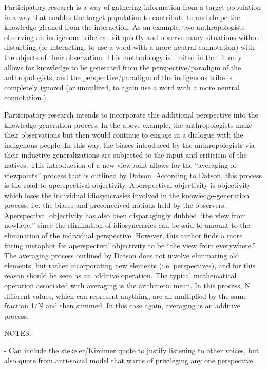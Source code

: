 \documentclass{lps}
\begin{document}
Participatory research is a way of gathering information from a target
population in a way that enables the target population to contribute to and
shape the knowledge gleaned from the interaction. As an example, two
anthropologists observing an indigenous tribe can sit quietly and observe many
situations without disturbing (or interacting, to use a word with a more
neutral connotation) with the objects of their observation. This methodology
is limited in that it only allows for knowledge to be generated from the
perspective/paradigm of the anthropologists, and the perspective/paradigm of
the indigenous tribe is completely ignored (or unutilized, to again use a word
with a more neutral connotation.)

Participatory research intends to incorporate this additional perspective into
the knowledge-generation process. In the above example, the anthropologists
make their observations but then would continue to engage in a dialogue with
the indigenous people. In this way, the biases introduced by the
anthropologists via their inductive generalizations are subjected to the input
and criticism of the natives. This introduction of a new viewpoint allows for
the “averaging of viewpoints” process that is outlined by Datson. According to
Datson, this process is the road to aperspectival objectivity. Aperspectival
objectivity is objectivity which loses the individual idiosyncrasies involved
in the knowledge-generation process, i.e. the biases and preconceived notions
held by the observers. Aperspectival objectivity has also been disparagingly
dubbed “the view from nowhere,” since the elimination of idiosyncrasies can be
said to amount to the elimination of the individual perspective. However, this
author finds a more fitting metaphor for aperspectival objectivity to be “the
view from everywhere.” The averaging process outlined by Datson does not
involve eliminating old elements, but rather incorporating new elements (i.e.
perspectives), and for this reason should be seen as an additive operation.
The typical mathematical operation associated with averaging is the arithmetic
mean. In this process, N different values, which can represent anything, are
all multiplied by the same fraction 1/N and then summed. In this case again,
averaging is an additive process.


NOTES:

- Can include the stekeler/Kirchner quote to justify listening to other
voices, but also quote from anti-social model that warns of privileging any
one perspective.
\end{document}
